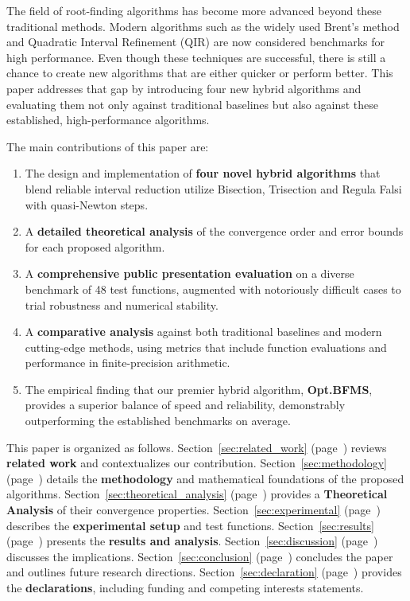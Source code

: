 \documentclass[amsmath, amssymb, aps]{revtex4-2}
\begin{document}
The field of root-finding algorithms has become more advanced beyond these traditional methods. Modern algorithms such as the widely used Brent's method and Quadratic Interval Refinement (QIR) are now considered benchmarks for high performance. Even though these techniques are successful, there is still a chance to create new algorithms that are either quicker or perform better. This paper addresses that gap by introducing four new hybrid algorithms and evaluating them not only against traditional baselines but also against these established, high-performance algorithms.

The main contributions of this paper are:
\begin{enumerate}
    \item The design and implementation of \textbf{four novel hybrid algorithms} that blend reliable interval reduction utilize Bisection, Trisection and Regula Falsi with quasi-Newton steps.
    \item A \textbf{detailed theoretical analysis} of the convergence order and error bounds for each proposed algorithm.
    \item A \textbf{comprehensive public presentation evaluation} on a diverse benchmark of 48 test functions, augmented with notoriously difficult cases to trial robustness and numerical stability.
    \item A \textbf{comparative analysis} against both traditional baselines and modern cutting-edge methods, using metrics that include function evaluations and performance in finite-precision arithmetic.
    \item The empirical finding that our premier hybrid algorithm, \textbf{Opt.BFMS}, provides a superior balance of speed and reliability, demonstrably outperforming the established benchmarks on average.
\end{enumerate}

This paper is organized as follows. Section~\ref{sec:related_work} (page~\pageref{sec:related_work}) reviews \textbf{related work} and contextualizes our contribution. Section~\ref{sec:methodology} (page~\pageref{sec:methodology}) details the \textbf{methodology} and mathematical foundations of the proposed algorithms. Section~\ref{sec:theoretical_analysis} (page~\pageref{sec:theoretical_analysis}) provides a \textbf{Theoretical Analysis} of their convergence properties. Section~\ref{sec:experimental} (page~\pageref{sec:experimental}) describes the \textbf{experimental setup} and test functions. Section~\ref{sec:results} (page~\pageref{sec:results}) presents the \textbf{results and analysis}. Section~\ref{sec:discussion} (page~\pageref{sec:discussion}) discusses the implications. Section~\ref{sec:conclusion} (page~\pageref{sec:conclusion}) concludes the paper and outlines future research directions. Section~\ref{sec:declaration} (page~\pageref{sec:declaration}) provides the \textbf{declarations}, including funding and competing interests statements.
\end{document}
